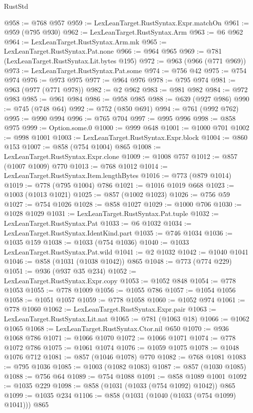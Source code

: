 \begin{lexlean}{RustStd}
\begin{coremodule}
@958 := @768 @957
@959 := LexLeanTarget.RustSyntax.Expr.matchOn
@961 := @959 (@795 @930)
@962 := LexLeanTarget.RustSyntax.Arm
@963 := @6 @962
@964 := LexLeanTarget.RustSyntax.Arm.mk
@965 := LexLeanTarget.RustSyntax.Pat.none
@966 := @964 @965
@969 := @781 (LexLeanTarget.RustSyntax.Lit.bytes @195)
@972 := @963 (@966 (@771 @969))
@973 := LexLeanTarget.RustSyntax.Pat.some
@974 := @756 @42
@975 := @754 @974
@976 := @973 @975
@977 := @964 @976
@978 := @795 @974
@981 := @963 (@977 (@771 @978))
@982 := @2 @962
@983 := @981 @982
@984 := @972 @983
@985 := @961 @984
@986 := @958 @985
@988 := @639 (@927 @986)
@990 := @745 (@748 @64)
@992 := @752 (@850 @691)
@994 := @761 (@992 @762)
@995 := @990 @994
@996 := @765 @704
@997 := @995 @996
@998 := @858 @975
@999 := Option.some.{0}
@1000 := @999 @648
@1001 := @1000 @701
@1002 := @998 @1001
@1003 := LexLeanTarget.RustSyntax.Expr.block
@1004 := @860 @153
@1007 := @858 (@754 @1004) @865
@1008 := LexLeanTarget.RustSyntax.Expr.clone
@1009 := @1008 @757
@1012 := @857 (@1007 @1009) @770
@1013 := @768 @1012
@1014 := LexLeanTarget.RustSyntax.Item.lengthBytes
@1016 := @773 (@879 @1014)
@1019 := @778 (@795 @1004) @786
@1021 := @1016 @1019 @668
@1023 := @1003 (@1013 @1021)
@1025 := @857 (@1002 @1023)
@1026 := @756 @59
@1027 := @754 @1026
@1028 := @858 @1027
@1029 := @1000 @706
@1030 := @1028 @1029
@1031 := LexLeanTarget.RustSyntax.Pat.tuple
@1032 := LexLeanTarget.RustSyntax.Pat
@1033 := @6 @1032
@1034 := LexLeanTarget.RustSyntax.IdentKind.part
@1035 := @746 @1034
@1036 := @1035 @159
@1038 := @1033 (@754 @1036)
@1040 := @1033 LexLeanTarget.RustSyntax.Pat.wild
@1041 := @2 @1032
@1042 := @1040 @1041
@1046 := @858 (@1031 (@1038 @1042)) @865
@1048 := @773 (@774 @229)
@1051 := @936 (@937 @35 @234)
@1052 := LexLeanTarget.RustSyntax.Expr.copy
@1053 := @1052 @848
@1054 := @778 @1053
@1055 := @778 @1009
@1056 := @1055 @786
@1057 := @1054 @1056
@1058 := @1051 @1057
@1059 := @778 @1058
@1060 := @1052 @974
@1061 := @778 @1060
@1062 := LexLeanTarget.RustSyntax.Expr.pair
@1063 := LexLeanTarget.RustSyntax.Lit.nat
@1065 := @781 (@1063 @18)
@1066 := @1062 @1065
@1068 := LexLeanTarget.RustSyntax.Ctor.nil @650
@1070 := @936 @1068 @786
@1071 := @1066 @1070
@1072 := @1066 @1071
@1074 := @778 @1072 @786
@1075 := @1061 @1074
@1076 := @1059 @1075
@1078 := @1048 @1076 @712
@1081 := @857 (@1046 @1078) @770
@1082 := @768 @1081
@1083 := @795 @1036
@1085 := @1003 (@1082 @1083)
@1087 := @857 (@1030 @1085)
@1088 := @756 @64
@1089 := @754 @1088
@1091 := @858 @1089 @1001
@1092 := @1035 @229
@1098 := @858 (@1031 (@1033 (@754 @1092) @1042)) @865
@1099 := @1035 @234
@1106 := @858 (@1031 (@1040 (@1033 (@754 @1099) @1041))) @865

\end{coremodule}
\end{lexlean}
